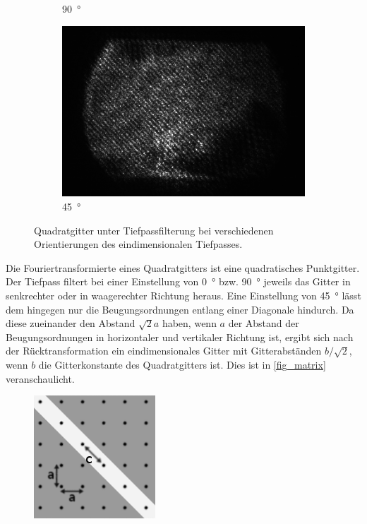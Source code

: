 \documentclass[
	a4paper,
	12pt,
	pagesize,
	ngerman
]{scrartcl}
\begin{document}
\begin{itemize}
\begin{figure}[H]
\begin{subfigure}[b]{0.475\textwidth}
            \caption[]%
            {\SI{90}{\degree}}
            \label{fig_4_quad_90}
        \end{subfigure}
				\begin{subfigure}[b]{0.475\textwidth}
            \centering
            \includegraphics[width=\textwidth]{raw/4/4_quad_spaltdiagonal_crop}
            \caption%
            {\SI{45}{\degree}}
            \label{fig_4_quad_45}
        \end{subfigure}
        \caption%
        {
					Quadratgitter unter Tiefpassfilterung bei verschiedenen Orientierungen des eindimensionalen Tiefpasses.
				}
        \label{fig_4_quad}
    \end{figure}
	Die Fouriertransformierte eines Quadratgitters ist eine quadratisches Punktgitter.
	Der Tiefpass filtert bei einer Einstellung von \SI{0}{\degree} bzw. \SI{90}{\degree} jeweils das Gitter in senkrechter oder in waagerechter Richtung heraus.
	Eine Einstellung von \SI{45}{\degree} lässt dem hingegen nur die Beugungsordnungen entlang einer Diagonale hindurch.
	Da diese zueinander den Abstand $\sqrt{2}a$ haben, wenn $a$ der Abstand der Beugungsordnungen in horizontaler und vertikaler Richtung ist, ergibt sich nach der Rücktransformation ein eindimensionales Gitter mit Gitterabständen $b/\sqrt{2}$, wenn $b$ die Gitterkonstante des Quadratgitters ist.
	Dies ist in \cref{fig_matrix} veranschaulicht.
	\begin{figure}[H]
			\includegraphics[width=0.5\linewidth]{img/matrix}

\end{figure}
\end{itemize}
\end{document}
